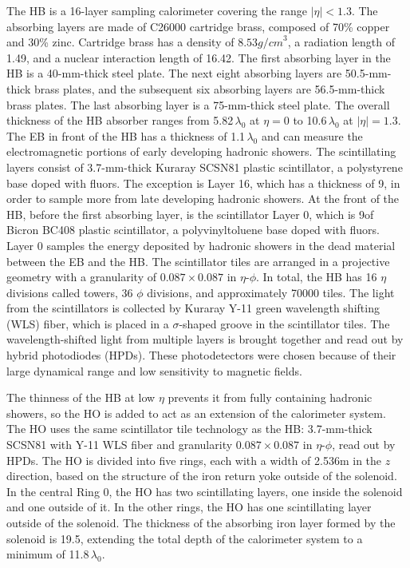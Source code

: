 The HB is a 16-layer sampling calorimeter covering the range $|\eta|<1.3$. The absorbing layers are made of C26000 cartridge brass, composed of 70\% copper and 30\% zinc. Cartridge brass has a density of $8.53\unit{g/cm}^3$, a radiation length of 1.49\cm, and a nuclear interaction length of 16.42\cm. The first absorbing layer in the HB is a 40-mm-thick steel plate. The next eight absorbing layers are 50.5-mm-thick brass plates, and the subsequent six absorbing layers are 56.5-mm-thick brass plates. The last absorbing layer is a 75-mm-thick steel plate. The overall thickness of the HB absorber ranges from 5.82$\,\lambda_{0}$ at $\eta=0$ to 10.6$\,\lambda_{0}$ at $|\eta|=1.3$. The EB in front of the HB has a thickness of 1.1$\,\lambda_{0}$ and can measure the electromagnetic portions of early developing hadronic showers. The scintillating layers consist of 3.7-mm-thick Kuraray SCSN81 plastic scintillator, a polystyrene base doped with fluors. The exception is Layer 16, which has a thickness of 9\mm, in order to sample more from late developing hadronic showers. At the front of the HB, before the first absorbing layer, is the scintillator Layer 0, which is 9\mm of Bicron BC408 plastic scintillator, a polyvinyltoluene base doped with fluors. Layer 0 samples the energy deposited by hadronic showers in the dead material between the EB and the HB. The scintillator tiles are arranged in a projective geometry with a granularity of $0.087\times0.087$ in $\eta$-$\phi$. In total, the HB has 16 $\eta$ divisions called towers, 36 $\phi$ divisions, and approximately 70000 tiles. The light from the scintillators is collected by Kuraray Y-11 green wavelength shifting (WLS) fiber, which is placed in a $\sigma$-shaped groove in the scintillator tiles. The wavelength-shifted light from multiple layers is brought together and read out by hybrid photodiodes (HPDs). These photodetectors were chosen because of their large dynamical range and low sensitivity to magnetic fields.

The thinness of the HB at low $\eta$ prevents it from fully containing hadronic showers, so the HO is added to act as an extension of the calorimeter system. The HO uses the same scintillator tile technology as the HB: 3.7-mm-thick SCSN81 with Y-11 WLS fiber and granularity $0.087\times0.087$ in $\eta$-$\phi$, read out by HPDs. The HO is divided into five rings, each with a width of 2.536\unit{m} in the $z$ direction, based on the structure of the iron return yoke outside of the solenoid. In the central Ring 0, the HO has two scintillating layers, one inside the solenoid and one outside of it. In the other rings, the HO has one scintillating layer outside of the solenoid. The thickness of the absorbing iron layer formed by the solenoid is 19.5\cm, extending the total depth of the calorimeter system to a minimum of 11.8$\,\lambda_{0}$.

